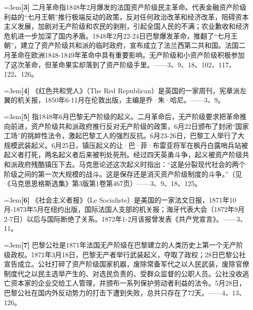 \documentclass[UTF8,zihao=-4,a4paper]{ctexart}
\begin{document}
\noindent\hangindent=3em\textbf{[3]} 二月革命指1848年2月爆发的法国资产阶级民主革命。代表金融资产阶级利益的“七月王朝”推行极端反动的政策，反对任何政治改革和经济改革，阻碍资本主义发展，加剧对无产阶级和农民的剥削，引起全国人民的不满；农业歉收和经济危机进一步加深了国内矛盾。1848年2月22-24日巴黎爆发革命，推翻了“七月王朝”，建立了资产阶级共和派的临时政府，宣布成立了法兰西第二共和国。法国二月革命在欧洲1848-1849年革命中具有重要影响。无产阶级和小资产阶级积极参加了这次革命，但革命果实却落到了资产阶级手里。——3、9、18、102、117、122、126。\par
\noindent\hangindent=3em\textbf{[4]} 《红色共和党人》（The Red Republican）是英国的一家周刊，宪章派左翼的机关报，1850年6-11月在伦敦出版，主编是乔·朱·哈尼。——3、9。\par
\noindent\hangindent=3em\textbf{[5]} 指1848年6月巴黎无产阶级的起义。二月革命后，无产阶级要求把革命推向前进，资产阶级共和派政府推行反对无产阶级的政策，6月22日颁布了封闭“国家工场”的挑衅性法令，激起巴黎工人的强烈反抗。6月23-26日，巴黎工人举行了大规模武装起义。6月25日，镇压起义的让·巴·菲·布雷亚将军在枫丹白露哨兵站被起义者打死，两名起义者后来被判处死刑。经过四天英勇斗争，起义被资产阶级共和派政府残酷镇压下去。马克思论述这次起义时指出：“这是分裂现代社会的两个阶级之间的第一次大规模的战斗。这是保存还是消灭资产阶级制度的斗争。”（见《马克思恩格斯选集》第3版第1卷第467页）——3、9、18、125。\par
\noindent\hangindent=3em\textbf{[6]} 《社会主义者报》（Le Socialiste）是美国的一家法文日报，1871年10月-1873年5月在纽约出版，国际法国人支部的机关报；海牙代表大会（1872年9月2-7日）以后与国际断绝了关系。1872年1-2月该报曾发表《共产党宣言》。——3、11。\par
\noindent\hangindent=3em\textbf{[7]} 巴黎公社是1871年法国无产阶级在巴黎建立的人类历史上第一个无产阶级政权。1871年3月18日，巴黎无产者举行武装起义，夺取了政权；28日巴黎公社宣告成立。公社打碎了资产阶级国家机器，废除常备军代之以人民武装，废除官僚制度代之以民主选举产生的、对选民负责的、受群众监督的公职人员。公社没收逃亡资本家的企业交给工人管理，并颁布一系列保护劳动者利益的法令。5月28日，巴黎公社在国内外反动势力的打击下遭到失败，总共只存在了72天。——4、13、126。\par
\end{document}
